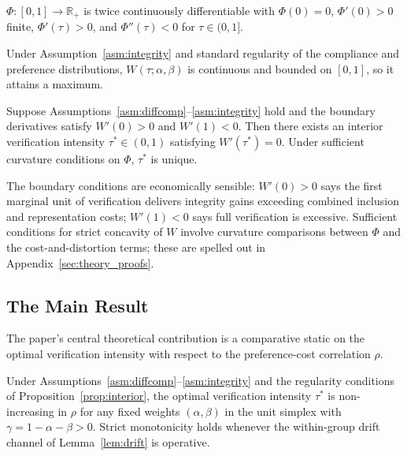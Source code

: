 \begin{assumption}
\label{asm:integrity}
$\Phi: [0,1] \to \mathbb{R}_+$ is twice continuously differentiable with $\Phi(0) = 0$, $\Phi'(0) > 0$ finite, $\Phi'(\tau) > 0$, and $\Phi''(\tau) < 0$ for $\tau \in (0, 1]$.
\end{assumption}

Under Assumption~\ref{asm:integrity} and standard regularity of the compliance and preference distributions, $W(\tau; \alpha, \beta)$ is continuous and bounded on $[0, 1]$, so it attains a maximum.

\begin{proposition}
\label{prop:interior}
Suppose Assumptions~\ref{asm:diffcomp}--\ref{asm:integrity} hold and the boundary derivatives satisfy $W'(0) > 0$ and $W'(1) < 0$. Then there exists an interior verification intensity $\tau^* \in (0, 1)$ satisfying $W'(\tau^*) = 0$. Under sufficient curvature conditions on $\Phi$, $\tau^*$ is unique.
\end{proposition}

The boundary conditions are economically sensible: $W'(0) > 0$ says the first marginal unit of verification delivers integrity gains exceeding combined inclusion and representation costs; $W'(1) < 0$ says full verification is excessive. Sufficient conditions for strict concavity of $W$ involve curvature comparisons between $\Phi$ and the cost-and-distortion terms; these are spelled out in Appendix~\ref{sec:theory_proofs}.

\subsection{The Main Result}
\label{ssec:main_result}

The paper's central theoretical contribution is a comparative static on the optimal verification intensity with respect to the preference-cost correlation $\rho$.

\begin{proposition}
\label{prop:main}
Under Assumptions~\ref{asm:diffcomp}--\ref{asm:integrity} and the regularity conditions of Proposition~\ref{prop:interior}, the optimal verification intensity $\tau^*$ is non-increasing in $\rho$ for any fixed weights $(\alpha, \beta)$ in the unit simplex with $\gamma = 1 - \alpha - \beta > 0$. Strict monotonicity holds whenever the within-group drift channel of Lemma~\ref{lem:drift} is operative.
\end{proposition}


